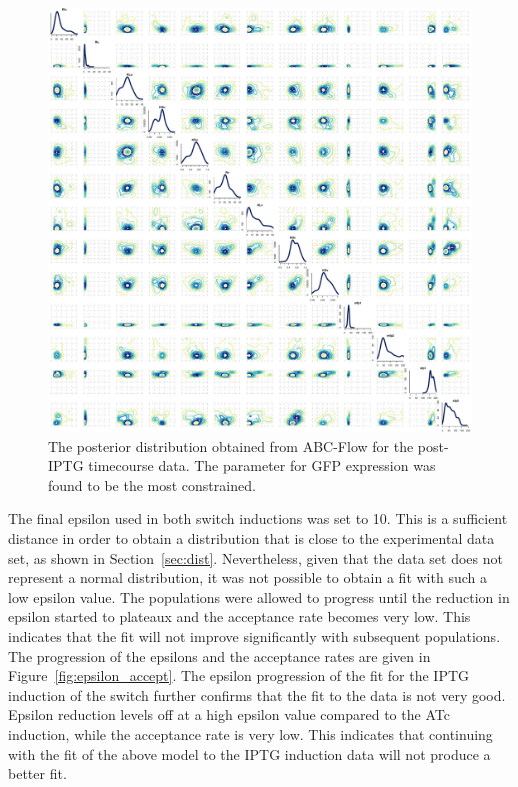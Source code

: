 \begin{figure}[htbp]
\centerfloat
	\includegraphics[width=\textwidth]{../../chapters/chapterABCFlow/images/real_data_stuff/posterior2D_pop9_100p-IPTG.pdf}
	\caption[Posterior distribution of inferred parameters for post-IPTG induction of the toggle switchn]{\label{fig:1atc-post} The posterior distribution obtained from ABC-Flow for the post-IPTG timecourse data. The parameter for GFP expression was found to be the most constrained. }
\end{figure}


The final epsilon used in both switch inductions was set to 10. This is a sufficient distance in order to obtain a distribution that is close to the experimental data set, as shown in Section~\ref{sec:dist}. Nevertheless, given that the data set does not represent a normal distribution, it was not possible to obtain a fit with such a low epsilon value. The populations were allowed to progress until the reduction in epsilon started to plateaux and the acceptance rate becomes very low. This indicates that the fit will not improve significantly with subsequent populations. The progression of the epsilons and the acceptance rates are given in Figure~\ref{fig:epsilon_accept}. The epsilon progression of the fit for the IPTG induction of the switch further confirms that the fit to the data is not very good. Epsilon reduction levels off at a high epsilon value compared to the ATc induction, while the acceptance rate is very low. This indicates that continuing with the fit of the above model to the IPTG induction data will not produce a better fit. 



